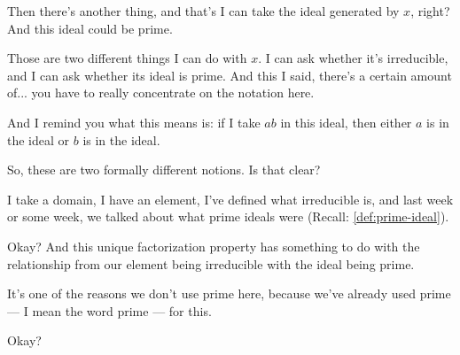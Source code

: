 \begin{speech}[00:30:11 - 00:32:16]
Then there's another thing, and that's I can take the ideal generated by $x$,  right? And this ideal could be prime. 

Those are two different things I can do with $x$. I can ask whether it's irreducible, and I can ask whether its ideal is prime. And this I said, there's a certain amount of... you have to really concentrate on the notation here.

And I remind you what this means is: if I take $a b$ in this ideal,  then either $a$ is in the ideal  or $b$ is in the ideal. 

So, these are two formally different notions. Is that clear?

I take a domain, I have an element, I've defined what irreducible is, and last week or some week, we talked about what prime ideals were (Recall: \cref{def:prime-ideal}).

Okay? And this unique factorization property has something to do with the relationship from our element being irreducible with the ideal being prime.

It's one of the reasons we don't use prime here,  because we've already used prime --- I mean the word prime --- for this. 

Okay?
\end{speech}

\begin{content}
\end{content}

